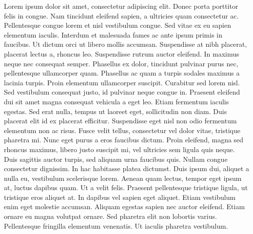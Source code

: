 \documentclass{thesis} %
\begin{document}
Lorem ipsum dolor sit amet, consectetur adipiscing elit. Donec porta porttitor felis in congue. Nam tincidunt eleifend sapien, a ultricies quam consectetur ac. Pellentesque congue lorem et nisl vestibulum congue. Sed vitae ex eu sapien elementum iaculis. Interdum et malesuada fames ac ante ipsum primis in faucibus. Ut dictum orci ut libero mollis accumsan. Suspendisse at nibh placerat, placerat lectus a, rhoncus leo. Suspendisse rutrum auctor eleifend. In maximus neque nec consequat semper. Phasellus ex dolor, tincidunt pulvinar purus nec, pellentesque ullamcorper quam. Phasellus ac quam a turpis sodales maximus a lacinia turpis. Proin elementum ullamcorper suscipit. Curabitur sed lorem nisl. Sed vestibulum consequat justo, id pulvinar neque congue in. Praesent eleifend dui sit amet magna consequat vehicula a eget leo. Etiam fermentum iaculis egestas. Sed erat nulla, tempus ut laoreet eget, sollicitudin non diam. Duis placerat elit id ex placerat efficitur. Suspendisse eget nisl non odio fermentum elementum non ac risus. Fusce velit tellus, consectetur vel dolor vitae, tristique pharetra mi. Nunc eget purus a eros faucibus dictum. Proin eleifend, magna sed rhoncus maximus, libero justo suscipit mi, vel ultricies sem ligula quis neque. Duis sagittis auctor turpis, sed aliquam urna faucibus quis. Nullam congue consectetur dignissim. In hac habitasse platea dictumst. Duis ipsum dui, aliquet a nulla eu, vestibulum scelerisque lorem. Aenean quam lectus, tempor eget ipsum at, luctus dapibus quam. Ut a velit felis. Praesent pellentesque tristique ligula, ut tristique eros aliquet at. In dapibus vel sapien eget aliquet. Etiam vestibulum enim eget molestie accumsan. Aliquam egestas sapien nec auctor eleifend. Etiam ornare eu magna volutpat ornare. Sed pharetra elit non lobortis varius. Pellentesque fringilla elementum venenatis. Ut iaculis pharetra vestibulum.

\newpage
\null
\newpage
\setcounter{page}{5} %
\end{document}
